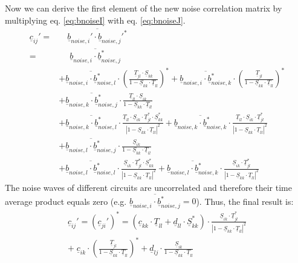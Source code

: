 Now we can derive the first element of the new noise correlation
matrix by multiplying eq. \eqref{eq:bnoiseI} with eq. \eqref{eq:bnoiseJ}.
\begin{equation}
\begin{split}
\underline{c}_{ij}' = & \quad \overline{\underline{b}_{noise,i}'\cdot\underline{b}_{noise,j}'^*} \\
 = & \quad\; \overline{\underline{b}_{noise,i}\cdot\underline{b}_{noise,j}^*} \\
 & + \overline{\underline{b}_{noise,i}\cdot\underline{b}_{noise,l}^*}\cdot
       \left( \frac{\underline{T}_{jl}\cdot \underline{S}_{kk}}{1-\underline{S}_{kk}\cdot\underline{T}_{ll}}
                \right)^* +
       \overline{\underline{b}_{noise,i}\cdot\underline{b}_{noise,k}^*}\cdot
       \left( \frac{\underline{T}_{jl}}{1-\underline{S}_{kk}\cdot\underline{T}_{ll}} \right) ^* \\
 & + \overline{\underline{b}_{noise,k}\cdot\underline{b}_{noise,j}^*}\cdot
       \frac{\underline{T}_{ll}\cdot \underline{S}_{ik}}{1-\underline{S}_{kk}\cdot\underline{T}_{ll}} \\
 & + \overline{\underline{b}_{noise,k}\cdot\underline{b}_{noise,l}^*}\cdot
       \frac{\underline{T}_{ll}\cdot \underline{S}_{ik}\cdot \underline{T}_{jl}^* \cdot\underline{S}_{kk}^*}
            {| 1-\underline{S}_{kk}\cdot\underline{T}_{ll} |^2} +
       \overline{\underline{b}_{noise,k}\cdot\underline{b}_{noise,k}^*}\cdot
       \frac{\underline{T}_{ll}\cdot \underline{S}_{ik}\cdot \underline{T}_{jl}^*}
            {| 1-\underline{S}_{kk}\cdot\underline{T}_{ll} |^2} \\
 & + \overline{\underline{b}_{noise,l}\cdot\underline{b}_{noise,j}^*}\cdot
       \frac{\underline{S}_{ik}}{1-\underline{S}_{kk}\cdot\underline{T}_{ll}} \\
 & + \overline{\underline{b}_{noise,l}\cdot\underline{b}_{noise,l}^*}\cdot
       \frac{\underline{S}_{ik}\cdot \underline{T}_{jl}^*\cdot \underline{S}_{kk}^*}
            {| 1-\underline{S}_{kk}\cdot\underline{T}_{ll} |^2} +
       \overline{\underline{b}_{noise,l}\cdot\underline{b}_{noise,k}^*}\cdot
       \frac{\underline{S}_{ik}\cdot \underline{T}_{jl}^*}
            {| 1-\underline{S}_{kk}\cdot\underline{T}_{ll} |^2}
\end{split}
\end{equation}
The noise waves of different circuits are uncorrelated and therefore
their time average product equals zero (e.g.
$\overline{\underline{b}_{noise,i}\cdot\underline{b}_{noise,j}^*} =
0$).  Thus, the final result is:
\begin{equation}
\begin{split}
\underline{c}_{ij}' = (\underline{c}_{ji}')^* =
   (\underline{c}_{kk}\cdot\underline{T}_{ll} + \underline{d}_{ll}\cdot\underline{S}_{kk}^*)\cdot
   \frac{\underline{S}_{ik}\cdot\underline{T}_{jl}^*}{|1-\underline{S}_{kk}\cdot\underline{T}_{ll}|^2}
\\ + \;\underline{c}_{ik}\cdot
     \left(\frac{\underline{T}_{jl}}{1-\underline{S}_{kk}\cdot\underline{T}_{ll}}\right)^*
   + \underline{d}_{lj}\cdot
     \frac{\underline{S}_{ik}}{1-\underline{S}_{kk}\cdot\underline{T}_{ll}}
\end{split}
\end{equation}



